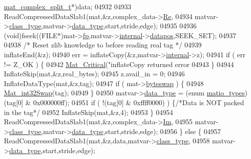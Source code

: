 \begin{DoxyCode}
{{{{{{{{{{{{{{{{{{{{{{{{{{{{{      \hyperlink{group___m_a_t_structmat__complex__split__t}{mat\_complex\_split\_t}*)data;
04932 
04933             ReadCompressedDataSlab1(mat,&z,complex\_data->\hyperlink{group___m_a_t_a484a93607508adac2bce53a0252e0325}{Re},
04934                 matvar->\hyperlink{group___m_a_t_aff13035bf3265dd7d9425e5d40c839d4}{class\_type},matvar->\hyperlink{group___m_a_t_ab6aafe9bd77f0f077852593dec438144}{data\_type},start,stride,edge);
04935 
04936             (void)fseek((FILE*)mat->\hyperlink{struct__mat__t_a85f562e407ca9ad4d2a6e14f839432b7}{fp},matvar->\hyperlink{group___m_a_t_a6e97e3ed9f40c49322c18561c2a94e92}{internal}->\hyperlink{structmatvar__internal_afd3bfaab126a160bd6855563e1ea0a7e}{datapos},SEEK\_SET);
04937 
04938             \textcolor{comment}{/* Reset zlib knowledge to before reading real tag */}
04939             inflateEnd(&z);
04940             err = inflateCopy(&z,matvar->\hyperlink{group___m_a_t_a6e97e3ed9f40c49322c18561c2a94e92}{internal}->z);
04941             \textcolor{keywordflow}{if} ( err != Z\_OK ) \{
04942                 \hyperlink{group__mat__util_gaf51f2bfbb5580f575e4dd79757e2b80c}{Mat\_Critical}(\textcolor{stringliteral}{"inflateCopy returned error %
04943             \}
04944             InflateSkip(mat,&z,real\_bytes);
04945             z.avail\_in = 0;
04946             InflateDataType(mat,&z,tag);
04947             \textcolor{keywordflow}{if} ( mat->\hyperlink{struct__mat__t_a99d207977af5e04941ace56d71817a40}{byteswap} ) \{
04948                 \hyperlink{endian_8c_a2e0153996243f0a34df9a5286087cfa3}{Mat\_int32Swap}(tag);
04949             \}
04950             matvar->\hyperlink{group___m_a_t_ab6aafe9bd77f0f077852593dec438144}{data\_type} = (\textcolor{keyword}{enum} \hyperlink{group___m_a_t_gacf7b3b879282b7ab3a51190e49bf3453}{matio\_types})(tag[0] & 0x000000ff);
04951             \textcolor{keywordflow}{if} ( !(tag[0] & 0xffff0000) ) \{\textcolor{comment}{/*Data is NOT packed in the tag*/}
04952                 InflateSkip(mat,&z,4);
04953             \}
04954             ReadCompressedDataSlab1(mat,&z,complex\_data->\hyperlink{group___m_a_t_a7182d10b0d3598415887376065440946}{Im},
04955                 matvar->\hyperlink{group___m_a_t_aff13035bf3265dd7d9425e5d40c839d4}{class\_type},matvar->\hyperlink{group___m_a_t_ab6aafe9bd77f0f077852593dec438144}{data\_type},start,stride,edge);
04956         \} \textcolor{keywordflow}{else} \{
04957             ReadCompressedDataSlab1(mat,&z,data,matvar->\hyperlink{group___m_a_t_aff13035bf3265dd7d9425e5d40c839d4}{class\_type},
04958                 matvar->\hyperlink{group___m_a_t_ab6aafe9bd77f0f077852593dec438144}{data\_type},start,stride,edge);
}}}}}}}}}}}}}}}}}}}}}}}}}}}}}}
\end{DoxyCode}
